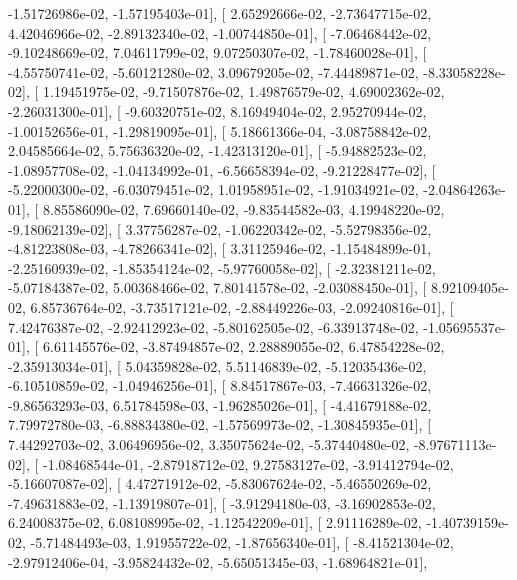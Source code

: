\documentclass{article}
\begin{document}
         -1.51726986e-02,  -1.57195403e-01],
       [  2.65292666e-02,  -2.73647715e-02,   4.42046966e-02,
         -2.89132340e-02,  -1.00744850e-01],
       [ -7.06468442e-02,  -9.10248669e-02,   7.04611799e-02,
          9.07250307e-02,  -1.78460028e-01],
       [ -4.55750741e-02,  -5.60121280e-02,   3.09679205e-02,
         -7.44489871e-02,  -8.33058228e-02],
       [  1.19451975e-02,  -9.71507876e-02,   1.49876579e-02,
          4.69002362e-02,  -2.26031300e-01],
       [ -9.60320751e-02,   8.16949404e-02,   2.95270944e-02,
         -1.00152656e-01,  -1.29819095e-01],
       [  5.18661366e-04,  -3.08758842e-02,   2.04585664e-02,
          5.75636320e-02,  -1.42313120e-01],
       [ -5.94882523e-02,  -1.08957708e-02,  -1.04134992e-01,
         -6.56658394e-02,  -9.21228477e-02],
       [ -5.22000300e-02,  -6.03079451e-02,   1.01958951e-02,
         -1.91034921e-02,  -2.04864263e-01],
       [  8.85586090e-02,   7.69660140e-02,  -9.83544582e-03,
          4.19948220e-02,  -9.18062139e-02],
       [  3.37756287e-02,  -1.06220342e-02,  -5.52798356e-02,
         -4.81223808e-03,  -4.78266341e-02],
       [  3.31125946e-02,  -1.15484899e-01,  -2.25160939e-02,
         -1.85354124e-02,  -5.97760058e-02],
       [ -2.32381211e-02,  -5.07184387e-02,   5.00368466e-02,
          7.80141578e-02,  -2.03088450e-01],
       [  8.92109405e-02,   6.85736764e-02,  -3.73517121e-02,
         -2.88449226e-03,  -2.09240816e-01],
       [  7.42476387e-02,  -2.92412923e-02,  -5.80162505e-02,
         -6.33913748e-02,  -1.05695537e-01],
       [  6.61145576e-02,  -3.87494857e-02,   2.28889055e-02,
          6.47854228e-02,  -2.35913034e-01],
       [  5.04359828e-02,   5.51146839e-02,  -5.12035436e-02,
         -6.10510859e-02,  -1.04946256e-01],
       [  8.84517867e-03,  -7.46631326e-02,  -9.86563293e-03,
          6.51784598e-03,  -1.96285026e-01],
       [ -4.41679188e-02,   7.79972780e-03,  -6.88834380e-02,
         -1.57569973e-02,  -1.30845935e-01],
       [  7.44292703e-02,   3.06496956e-02,   3.35075624e-02,
         -5.37440480e-02,  -8.97671113e-02],
       [ -1.08468544e-01,  -2.87918712e-02,   9.27583127e-02,
         -3.91412794e-02,  -5.16607087e-02],
       [  4.47271912e-02,  -5.83067624e-02,  -5.46550269e-02,
         -7.49631883e-02,  -1.13919807e-01],
       [ -3.91294180e-03,  -3.16902853e-02,   6.24008375e-02,
          6.08108995e-02,  -1.12542209e-01],
       [  2.91116289e-02,  -1.40739159e-02,  -5.71484493e-03,
          1.91955722e-02,  -1.87656340e-01],
       [ -8.41521304e-02,  -2.97912406e-04,  -3.95824432e-02,
         -5.65051345e-03,  -1.68964821e-01],
\end{document}
